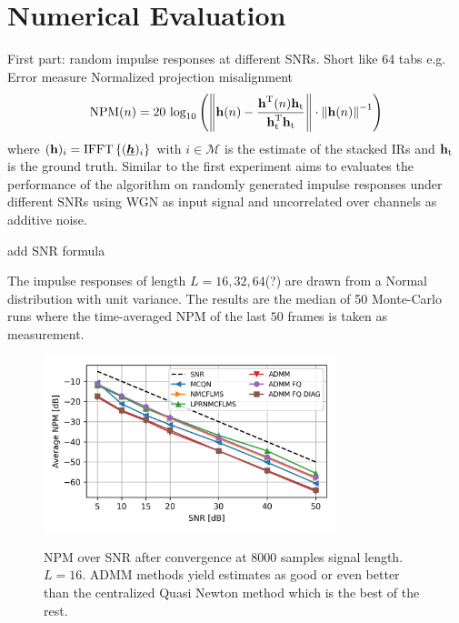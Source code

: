 \documentclass{article}
\newcommand{\h}{\mtxb{h}}
\newcommand{\hf}{\underline{\bm{h}}}
\newcommand{\Mset}{\mathcal{M}}
\begin{document}
\section{Numerical Evaluation}
\label{sec:perf_eval}

First part: random impulse responses at different SNRs. Short like 64 tabs e.g.
Error measure Normalized projection misalignment
\begin{equation}
    \text{NPM}(n) = 20\,\log_{10} \left(\left\| \h(n) - \frac{\h^\T (n) \h_{\text{t}}}{\h_{\text{t}}^\T \h_{\text{t}}} \right\| \cdot \left\|\h(n)\right\|^{-1}\right)
\end{equation}
where \((\h)_i = \operatorname{IFFT} \left\{ (\hf)_i \right\}\) with \(i \in \Mset\) is the estimate of the stacked IRs and \(\h_{\text{t}}\) is the ground truth.
Similar to \cite{} the first experiment aims to evaluates the performance of the algorithm on randomly generated impulse responses under different SNRs using WGN as input signal and uncorrelated over channels as additive noise.
\begin{attention}
    add SNR formula
\end{attention}
The impulse responses of length \(L=16,32,64\)(?) are drawn from a Normal distribution with unit variance.
The results are the median of 50 Monte-Carlo runs where the time-averaged NPM of the last \(50\) frames is taken as measurement.

\begin{figure}
    \centering
    \includegraphics[width=8.5cm]{python/plots/NPM_over_SNR_L16.png}\label{fig:perf_eval:NPM_over_SNR}
    \caption{NPM over SNR after convergence at 8000 samples signal length. \(L=16\). ADMM methods yield estimates as good or even better than the centralized Quasi Newton method which is the best of the rest.}
\end{figure}
\end{document}
